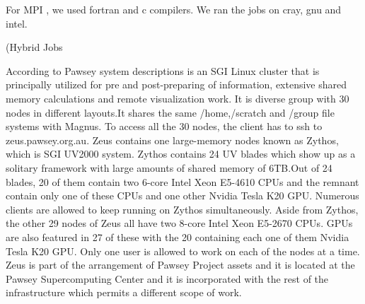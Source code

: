 \begin{Document}
{

For MPI , we used fortran and c compilers. We ran the jobs on cray, gnu and intel.











\Subsubsection(Hybrid Jobs}



According to Pawsey system descriptions is an SGI Linux cluster that is principally utilized for pre and post-preparing of information, extensive shared memory calculations and remote visualization work.
It is diverse group with 30 nodes in different layouts.It shares the same /home,/scratch and /group file systems with Magnus. 
To access all the 30 nodes, the client has to ssh to zeus.pawsey.org.au.
Zeus contains one large-memory nodes known as Zythos, which is SGI UV2000 system. 
Zythos contains 24 UV blades which show up as a solitary framework with large amounts of shared memory of 6TB.Out of 24 blades, 20 of them contain two 6-core Intel Xeon E5-4610 CPUs and the remnant contain only one of these CPUs and one other Nvidia Tesla K20 GPU. 
Numerous clients are allowed to keep running on Zythos simultaneously.
Aside from Zythos, the other 29 nodes of Zeus all have two 8-core Intel Xeon E5-2670 CPUs. 
GPUs are also featured in 27 of these with the 20 containing each one of them Nvidia Tesla K20 GPU. 
Only one user is allowed to work on each of the nodes at a time.
Zeus is part of the arrangement of Pawsey Project assets and it is located at the Pawsey Supercomputing Center and it is incorporated with the rest of the infrastructure which permits a different scope of work.
 






















\end{Document}
